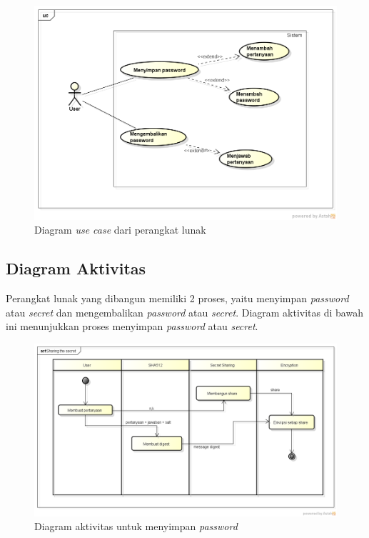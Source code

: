 \begin{figure}[H]
	\centerline{\includegraphics[scale=0.4]{Gambar/use_case}}
	\label{fig:use_case}
	\caption{Diagram \textit{use case} dari perangkat lunak}
\end{figure}

\subsection{Diagram Aktivitas}

Perangkat lunak yang dibangun memiliki 2 proses, yaitu menyimpan \textit{password} atau \textit{secret} dan mengembalikan \textit{password} atau \textit{secret}. Diagram aktivitas di bawah ini menunjukkan proses menyimpan \textit{password} atau \textit{secret}.

\begin{figure}[H]
	\centerline{\includegraphics[scale=0.4]{Gambar/sharing-secret}}
	\label{fig:sharing-secret}
	\caption{Diagram aktivitas untuk menyimpan \textit{password}}
\end{figure}

